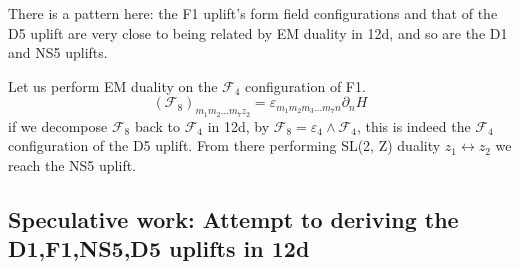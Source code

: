 There is a pattern here: the F1 uplift's form field configurations and that of the D5 uplift are very close to being related by EM duality in 12d, and so are the D1 and NS5 uplifts.

Let us perform EM duality on the $\mathcal{F}_4$ configuration of F1.
\begin{equation}
(\mathcal{F}_8)_{m_1 m_2 ...m_7 z_2} = \varepsilon_{m_1 m_2 m_3 ... m_7 n}\partial_n H
\end{equation}
if we decompose $\mathcal{F}_8$ back to $\mathcal{F}_4$ in 12d, by $\mathcal{F}_8 = \varepsilon_4 \wedge \mathcal{F}_4$, this is indeed the $\mathcal{F}_4$ configuration of the D5 uplift. From there performing SL(2, Z) duality $z_1 \leftrightarrow z_2$ we reach the NS5 uplift.

\subsection{Speculative work: Attempt to deriving the D1,F1,NS5,D5 uplifts in 12d}

